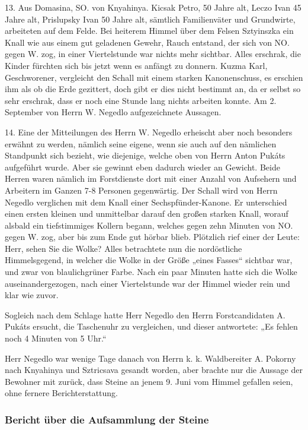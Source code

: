 \documentclass[a4paper, 11pt, oneside, german]{article}
\begin{document}
13. Aus Domasina, SO. von Knyahinya. Kicsak Petro, 50 Jahre alt, Leczo Ivan 45 Jahre alt, Prislupsky Ivan 50 Jahre alt, sämtlich Familienväter und Grundwirte, arbeiteten auf dem Felde. Bei heiterem Himmel über dem Felsen Sztyinszka ein Knall wie aus einem gut geladenen Gewehr, Rauch entstand, der sich von NO. gegen W. zog, in einer Viertelstunde war nichts mehr sichtbar. Alles erschrak, die Kinder fürchten sich bis jetzt wenn es anfängt zu donnern. Kuzma Karl, Geschworener, vergleicht den Schall mit einem starken Kanonenschuss, es erschien ihm als ob die Erde gezittert, doch gibt er dies nicht bestimmt an, da er selbst so sehr erschrak, dass er noch eine Stunde lang nichts arbeiten konnte. Am 2. September von Herrn W. Negedlo aufgezeichnete Aussagen.

14. Eine der Mitteilungen des Herrn W. Negedlo erheischt aber noch besonders erwähnt zu werden, nämlich seine eigene, wenn sie auch auf den nämlichen Standpunkt sich bezieht, wie diejenige, welche oben von Herrn Anton Pukáts aufgeführt wurde. Aber sie gewinnt eben dadurch wieder an Gewicht. Beide Herren waren nämlich im Forstdienste dort mit einer Anzahl von Aufsehern und Arbeitern im Ganzen 7-8 Personen gegenwärtig. Der Schall wird von Herrn Negedlo verglichen mit dem Knall einer Sechspfünder-Kanone. Er unterschied einen ersten kleinen und unmittelbar darauf den großen starken Knall, worauf alsbald ein tiefstimmiges Kollern begann, welches gegen zehn Minuten von NO. gegen W. zog, aber bis zum Ende gut hörbar blieb. Plötzlich rief einer der Leute: Herr, sehen Sie die Wolke? Alles betrachtete nun die nordöstliche Himmelsgegend, in welcher die Wolke in der Größe „eines Fasses“ sichtbar war, und zwar von blaulichgrüner Farbe. Nach ein paar Minuten hatte sich die Wolke auseinandergezogen, nach einer Viertelstunde war der Himmel wieder rein und klar wie zuvor.

Sogleich nach dem Schlage hatte Herr Negedlo den Herrn Forstcandidaten A. Pukáts ersucht, die Taschenuhr zu vergleichen, und dieser antwortete: „Es fehlen noch 4 Minuten von 5 Uhr.“

Herr Negedlo war wenige Tage danach von Herrn k. k. Waldbereiter A. Pokorny nach Knyahinya und Sztricsava gesandt worden, aber brachte nur die Aussage der Bewohner mit zurück, dass Steine an jenem 9. Juni vom Himmel gefallen seien, ohne fernere Berichterstattung.
\clearpage
\subsubsection{Bericht über die Aufsammlung der Steine}
\end{document}
